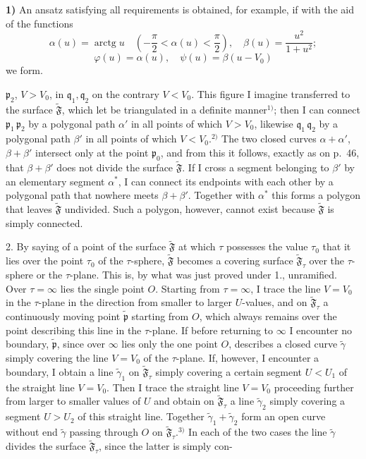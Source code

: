 \documentclass{article}
\begin{document}
\textbf{1)} An ansatz satisfying all requirements is obtained, for example, if with the aid of the functions
\[ \alpha(u) = \operatorname{arctg} u \quad \left( -\frac{\pi}{2} < \alpha(u) < \frac{\pi}{2} \right), \quad \beta(u) = \frac{u^2}{1 + u^2}; \]
\[ \varphi(u) = \alpha(u), \quad \psi(u) = \beta(u - V_0) \]
we form.

$\mathfrak{p}_2$, $V > V_0$, in $\mathfrak{q}_1, \mathfrak{q}_2$ on the contrary $V < V_0$. This figure I imagine transferred to the surface $\widetilde{\mathfrak{F}}$, which let be triangulated in a definite manner${}^{1)}$; then I can connect $\mathfrak{p}_1\,\mathfrak{p}_2$ by a polygonal path $\alpha'$ in all points of which $V > V_0$, likewise $\mathfrak{q}_1\,\mathfrak{q}_2$ by a polygonal path $\beta'$ in all points of which $V < V_0$.${}^{2)}$ The two closed curves $\alpha + \alpha'$, $\beta + \beta'$ intersect only at the point $\mathfrak{p}_0$, and from this it follows, exactly as on p.~46, that $\beta + \beta'$ does not divide the surface $\widetilde{\mathfrak{F}}$. If I cross a segment belonging to $\beta'$ by an elementary segment $\alpha^*$, I can connect its endpoints with each other by a polygonal path that nowhere meets $\beta + \beta'$. Together with $\alpha^*$ this forms a polygon that leaves $\widetilde{\mathfrak{F}}$ undivided. Such a polygon, however, cannot exist because $\widetilde{\mathfrak{F}}$ is simply connected.


2. By saying of a point of the surface $\widetilde{\mathfrak{F}}$ at which $\tau$ possesses the value $\tau_0$ that it lies over the point $\tau_0$ of the $\tau$-sphere, $\widetilde{\mathfrak{F}}$ becomes a covering surface $\widetilde{\mathfrak{F}}_\tau$ over the $\tau$-sphere or the $\tau$-plane. This is, by what was just proved under 1., unramified. Over $\tau = \infty$ lies the single point $O$. Starting from $\tau = \infty$, I trace the line $V = V_0$ in the $\tau$-plane in the direction from smaller to larger $U$-values, and on $\widetilde{\mathfrak{F}}_\tau$ a continuously moving point $\tilde{\mathfrak{p}}$ starting from $O$, which always remains over the point describing this line in the $\tau$-plane. If before returning to $\infty$ I encounter no boundary, $\tilde{\mathfrak{p}}$, since over $\infty$ lies only the one point $O$, describes a closed curve $\tilde{\gamma}$ simply covering the line $V = V_0$ of the $\tau$-plane. If, however, I encounter a boundary, I obtain a line $\tilde{\gamma}_1$ on $\widetilde{\mathfrak{F}}_\tau$ simply covering a certain segment $U < U_1$ of the straight line $V = V_0$. Then I trace the straight line $V = V_0$ proceeding further from larger to smaller values of $U$ and obtain on $\widetilde{\mathfrak{F}}_\tau$ a line $\tilde{\gamma}_2$ simply covering a segment $U > U_2$ of this straight line. Together $\tilde{\gamma}_1 + \tilde{\gamma}_2$ form an open curve without end $\tilde{\gamma}$ passing through $O$ on $\widetilde{\mathfrak{F}}_\tau$.${}^{3)}$ In each of the two cases the line $\tilde{\gamma}$ divides the surface $\widetilde{\mathfrak{F}}_\tau$, since the latter is simply con-
\end{document}
